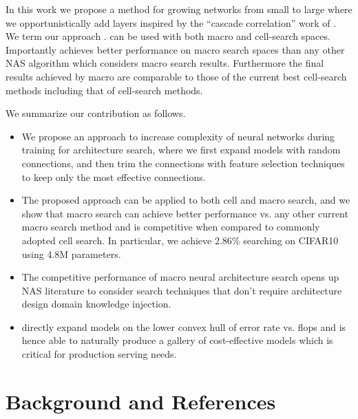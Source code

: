 In this work we propose a method for growing networks from small to large where we opportunistically add layers inspired by the ``cascade correlation'' work of \cite{cascadecorr}. We term our approach \Petridish. \Petridish can be used with both macro and cell-search spaces. Importantly \Petridish achieves better performance on macro search spaces than any other NAS algorithm which considers macro search results. Furthermore the final results achieved by \Petridish macro are comparable to those of the current best cell-search methods including that of \Petridish cell-search methods.

We summarize our contribution as follows.
\begin{itemize}
\item We propose an approach to increase complexity of neural networks during training for architecture search, where we first expand models with random connections, and then trim the connections with feature selection techniques to keep only the most effective connections. 
\item The proposed approach can be applied to both cell and macro search, and we show that macro search can achieve better performance vs. any other current macro search method and is competitive when compared to commonly adopted cell search. In particular, we achieve 2.86\% searching on CIFAR10 using 4.8M parameters.
\item The competitive performance of \Petridish macro neural architecture search opens up NAS literature to consider search techniques that don't require architecture design domain knowledge injection.
\item \Petridish directly expand models on the lower convex hull of error rate vs. flops and is hence able to naturally produce a gallery of cost-effective models which is critical for production serving needs. 
\end{itemize}


\section{Background and References}

